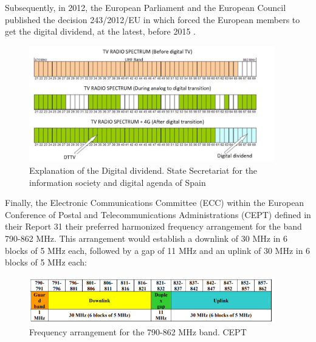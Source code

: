 Subsequently, in 2012, the European Parliament and the European Council published the decision 243/2012/EU in which forced the European members to get the digital dividend, at the latest, before 2015 \cite{1-06}.


\begin{figure}[H]
	\begin{Center}
		\includegraphics[width=0.95\textwidth]{./media/image2.png}
		\caption{Explanation of the Digital dividend. State Secretariat for the information society and digital agenda of Spain \cite{1-02}}
	\end{Center}
\end{figure}



Finally, the Electronic Communications Committee (ECC) within the European Conference of Postal and Telecommunications Administrations (CEPT) defined in their Report 31 \cite{1-07} their preferred harmonized frequency arrangement for the band 790-862 MHz. This arrangement would establish a downlink of 30 MHz in 6 blocks of 5 MHz each, followed by a gap of 11 MHz and an uplink of 30 MHz in 6 blocks of 5 MHz each:


\begin{figure}[H]
	\begin{Center}
		\includegraphics[width=0.95\textwidth]{./media/image3.png}
		\caption{Frequency arrangement for the 790-862 MHz band. CEPT\cite{1-07}}
	\end{Center}
\end{figure}

